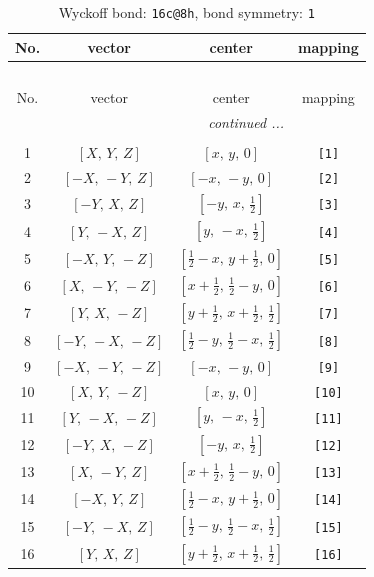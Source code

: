 \documentclass[fleqn,8pt]{jsarticle}
\begin{document}
\begin{longtable}{cccc}
\caption{Wyckoff bond: {\tt 16c@8h}, bond symmetry: {\tt 1}}
 \\
 \hline \hline
No. & vector & center & mapping \\ \hline \endfirsthead

\multicolumn{3}{l}{\tablename\ \thetable{}} \\
 \hline \hline
No. & vector & center & mapping \\ \hline \endhead

 \hline \hline
\multicolumn{3}{r}{\footnotesize\it continued ...} \\ \endfoot

 \hline \hline
\multicolumn{3}{r}{} \\ \endlastfoot

1 & $\left[ X,\, Y,\, Z \right]$ & $\left[ x,\, y,\, 0 \right]$ & {\tt [1]} \\ \hline
2 & $\left[ - X,\, - Y,\, Z \right]$ & $\left[ - x,\, - y,\, 0 \right]$ & {\tt [2]} \\ \hline
3 & $\left[ - Y,\, X,\, Z \right]$ & $\left[ - y,\, x,\, \frac{1}{2} \right]$ & {\tt [3]} \\ \hline
4 & $\left[ Y,\, - X,\, Z \right]$ & $\left[ y,\, - x,\, \frac{1}{2} \right]$ & {\tt [4]} \\ \hline
5 & $\left[ - X,\, Y,\, - Z \right]$ & $\left[ \frac{1}{2} - x,\, y + \frac{1}{2},\, 0 \right]$ & {\tt [5]} \\ \hline
6 & $\left[ X,\, - Y,\, - Z \right]$ & $\left[ x + \frac{1}{2},\, \frac{1}{2} - y,\, 0 \right]$ & {\tt [6]} \\ \hline
7 & $\left[ Y,\, X,\, - Z \right]$ & $\left[ y + \frac{1}{2},\, x + \frac{1}{2},\, \frac{1}{2} \right]$ & {\tt [7]} \\ \hline
8 & $\left[ - Y,\, - X,\, - Z \right]$ & $\left[ \frac{1}{2} - y,\, \frac{1}{2} - x,\, \frac{1}{2} \right]$ & {\tt [8]} \\ \hline
9 & $\left[ - X,\, - Y,\, - Z \right]$ & $\left[ - x,\, - y,\, 0 \right]$ & {\tt [9]} \\ \hline
10 & $\left[ X,\, Y,\, - Z \right]$ & $\left[ x,\, y,\, 0 \right]$ & {\tt [10]} \\ \hline
11 & $\left[ Y,\, - X,\, - Z \right]$ & $\left[ y,\, - x,\, \frac{1}{2} \right]$ & {\tt [11]} \\ \hline
12 & $\left[ - Y,\, X,\, - Z \right]$ & $\left[ - y,\, x,\, \frac{1}{2} \right]$ & {\tt [12]} \\ \hline
13 & $\left[ X,\, - Y,\, Z \right]$ & $\left[ x + \frac{1}{2},\, \frac{1}{2} - y,\, 0 \right]$ & {\tt [13]} \\ \hline
14 & $\left[ - X,\, Y,\, Z \right]$ & $\left[ \frac{1}{2} - x,\, y + \frac{1}{2},\, 0 \right]$ & {\tt [14]} \\ \hline
15 & $\left[ - Y,\, - X,\, Z \right]$ & $\left[ \frac{1}{2} - y,\, \frac{1}{2} - x,\, \frac{1}{2} \right]$ & {\tt [15]} \\ \hline
16 & $\left[ Y,\, X,\, Z \right]$ & $\left[ y + \frac{1}{2},\, x + \frac{1}{2},\, \frac{1}{2} \right]$ & {\tt [16]} \\
\end{longtable}
\end{document}
